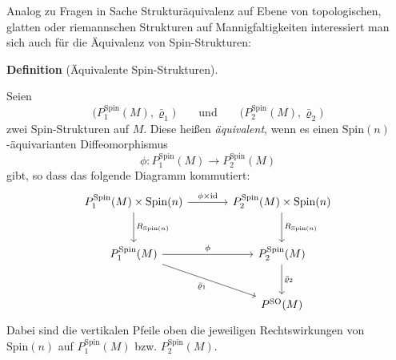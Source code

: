 \documentclass[10pt, letterpaper]{article}
\newcommand{\id}{\operatorname{id}}
\newcommand{\SO}{\mathrm{SO}}
\newcommand{\Spin}{\mathrm{Spin}}
\newcommand{\CustomHeading}[3]{%
  \par\medskip\noindent%
  \textbf{#1 #2} \textnormal{(#3)}.\enskip%
}
\newenvironment{DEF}[2]{\CustomHeading{Definition}{#1}{#2}}{}
\begin{document}
Analog zu Fragen in Sache Strukturäquivalenz auf Ebene von topologischen, glatten oder riemannschen Strukturen auf Mannigfaltigkeiten interessiert man sich auch für die Äquivalenz von Spin-Strukturen:

\begin{DEF}{}{Äquivalente Spin-Strukturen}
Seien
\[
\bigl(P_1^{\Spin}(M),\bar\varrho_1\bigr)
\qquad\text{und}\qquad
\bigl(P_2^{\Spin}(M),\bar\varrho_2\bigr)
\]
zwei Spin-Strukturen auf \(M\). Diese heißen \emph{äquivalent}, wenn es einen
\(\Spin(n)\)-äquivarianten Diffeomorphismus
\[
\phi:P_1^{\Spin}(M)\to P_2^{\Spin}(M)
\]
gibt, so dass das folgende Diagramm kommutiert:
\[
\begin{tikzcd}[column sep=large, row sep=large]
P_1^{\Spin}(M)\times \Spin(n) \arrow[r,"\phi\times \id"] \arrow[d,"R_{\Spin(n)}"] &
P_2^{\Spin}(M)\times \Spin(n) \arrow[d,"R_{\Spin(n)}"] \\
P_1^{\Spin}(M) \arrow[r,"\phi"] \arrow[dr,"\bar\varrho_1"'] &
P_2^{\Spin}(M) \arrow[d,"\bar\varrho_2"] \\
& P^{\SO}(M)
\end{tikzcd}
\]
Dabei sind die vertikalen Pfeile oben die jeweiligen Rechtswirkungen von
\(\Spin(n)\) auf \(P_1^{\Spin}(M)\) bzw. \(P_2^{\Spin}(M)\).
\end{DEF}
\end{document}
